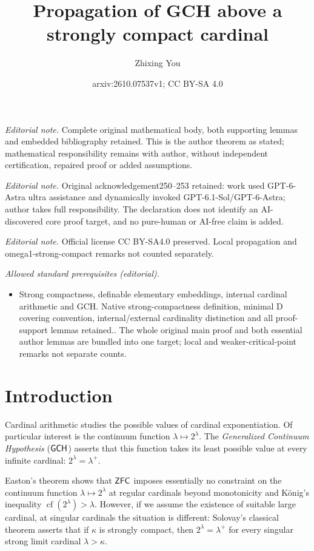\documentclass[10pt,a4paper]{amsart}
\title{Propagation of GCH above a strongly compact cardinal}
\author{Zhixing You}
\date{arxiv:2610.07537v1; CC BY-SA 4.0}
\theoremstyle{definition}
\theoremstyle{remark}
\DeclareMathOperator{\cf}{cf}
\newcommand*\axiomfont[1]{\textsf{\textup{#1}}}
\newcommand\zfc{\axiomfont{ZFC}}
\newcommand\gch{\axiomfont{GCH}}
\begin{document}
\maketitle
\noindent\textit{Editorial note.} Complete original mathematical body, both supporting lemmas and embedded bibliography retained. This is the author theorem as stated; mathematical responsibility remains with author, without independent certification, repaired proof or added assumptions.\par\medskip
\noindent\textit{Editorial note.} Original acknowledgement250--253 retained: work used GPT-6-Astra ultra assistance and dynamically invoked GPT-6.1-Sol/GPT-6-Astra; author takes full responsibility. The declaration does not identify an AI-discovered core proof target, and no pure-human or AI-free claim is added.\par\medskip
\noindent\textit{Editorial note.} Official license CC BY-SA4.0 preserved. Local propagation and omega1-strong-compact remarks not counted separately.\par\medskip
\noindent\textit{Allowed standard prerequisites (editorial).}\begin{itemize}
\item Strong compactness, definable elementary embeddings, internal cardinal arithmetic and GCH. Native strong-compactness definition, minimal D covering convention, internal/external cardinality distinction and all proof-support lemmas retained.. The whole original main proof and both essential author lemmas are bundled into one target; local and weaker-critical-point remarks not separate counts.
\end{itemize}\medskip
\section{Introduction}
Cardinal arithmetic studies the possible values of cardinal exponentiation.
Of particular interest is the continuum function $\lambda\mapsto 2^\lambda$.
The \emph{Generalized Continuum Hypothesis} ($\gch$) asserts that this function
takes its least possible value at every infinite cardinal:
$2^\lambda=\lambda^+$.

Easton's theorem \cite[Theorem~10.7]{Kanamori} shows that $\zfc$ imposes essentially no constraint
on the continuum function $\lambda\mapsto 2^\lambda$ at regular cardinals
beyond monotonicity and K\"onig's inequality $\cf(2^\lambda)>\lambda$.
However, if we assume the existence of suitable large cardinal, at singular cardinals the situation is different:
Solovay's classical theorem \cite[p.~308]{Kanamori} asserts that if $\kappa$ is strongly compact,
then $2^\lambda=\lambda^+$ for every singular strong limit cardinal $\lambda>\kappa$.
\end{document}
